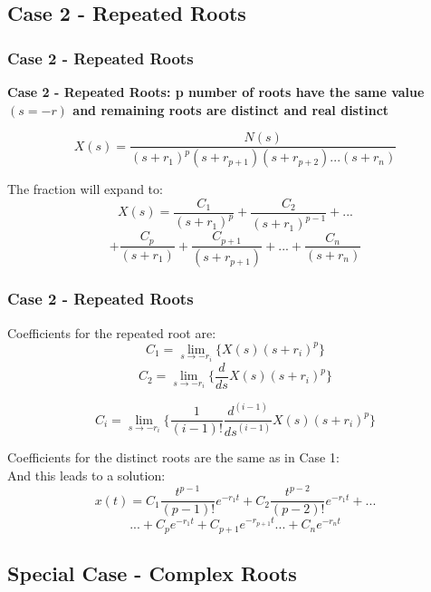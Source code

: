 \documentclass[fleqn]{beamer} %
\newcommand{\sectionIIIsubsectionIIItitle}{Case 2 - Repeated Roots}
\newcommand{\sectionIIIsubsectionIVtitle}{Special Case - Complex Roots}
\begin{document}
		\subsection{\sectionIIIsubsectionIIItitle}\label{sectionIIIsubsectionIII}

			\begin{frame}
				\frametitle{\sectionIIIsubsectionIIItitle}
				\bigskip

				\textbf{Case 2 - Repeated Roots: p number of roots have the same value $(s =-r)$ and remaining roots are distinct and real distinct} 
	
				\[X(s)=\frac{N(s)}{(s+r_1)^p(s+r_{p+1})(s+r_{p+2})...(s+r_n)} \]

				The fraction will expand to: \\

				\[X(s)=\frac{C_1}{(s+r_1)^p}+\frac{C_2}{(s+r_1)^{p-1}}+...\] 
				\[ +\frac{C_p}{(s+r_1)}+\frac{C_{p+1}}{(s+r_{p+1})}+...+\frac{C_n}{(s+r_n)} \]
			
				\btVFill
			\end{frame}

			\begin{frame}
				\frametitle{\sectionIIIsubsectionIIItitle}
				\bigskip

				Coefficients for the repeated root are:\\

				\[\displaystyle C_1=\lim_{s\rightarrow-r_i}\{X(s)(s+r_i)^p\} \]
				\[\displaystyle C_2=\lim_{s\rightarrow-r_i}\{\frac{d}{ds}X(s)(s+r_i)^p\} \]
				
				\[ \displaystyle C_i=\lim_{s\rightarrow-r_i}\{\frac{1}{(i-1)!}\frac{d^{(i-1)}}{ds^{(i-1)}}X(s)(s+r_i)^p\} \]

				Coefficients for the distinct roots are the same as in Case 1:\\

				And this leads to a solution: \\

				\[ x(t)=C_1\frac{t^{p-1}}{(p-1)!}e^{-r_1t}+C_2\frac{t^{p-2}}{(p-2)!}e^{-r_1t}+...\]
				\[ ...+C_{p}e^{-r_1t}+C_{p+1}e^{-r_{p+1}t}...+C_ne^{-r_nt} \]
			
				\btVFill
			\end{frame}

		\subsection{\sectionIIIsubsectionIVtitle}\label{sectionIIIsubsectionIV}	
\end{document}
